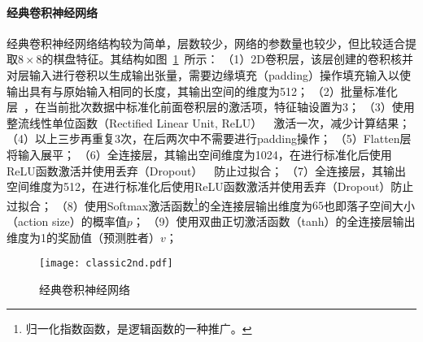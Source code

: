 \paragraph{经典卷积神经网络}
经典卷积神经网络结构较为简单，层数较少，网络的参数量也较少，但比较适合提取$8\times8$的棋盘特征。其结构如图~\ref{fig:cnn}~所示：
（1）2D卷积层，该层创建的卷积核并对层输入进行卷积以生成输出张量，需要边缘填充（padding）操作填充输入以使输出具有与原始输入相同的长度，其输出空间的维度为512；
（2）批量标准化层~\cite{batchnorm}，在当前批次数据中标准化前面卷积层的激活项，特征轴设置为3；
（3）使用整流线性单位函数（Rectified Linear Unit, ReLU）~\cite{xu2015empirical}~激活一次，减少计算结果；
（4）以上三步再重复3次，在后两次中不需要进行padding操作；
（5）Flatten层将输入展平；
（6）全连接层，其输出空间维度为1024，在进行标准化后使用ReLU函数激活并使用丢弃（Dropout）~\cite{srivastava2014dropout}~防止过拟合；
（7）全连接层，其输出空间维度为512，在进行标准化后使用ReLU函数激活并使用丢弃（Dropout）防止过拟合；
（8）使用Softmax激活函数\footnote{归一化指数函数，是逻辑函数的一种推广。}的全连接层输出维度为$65$也即落子空间大小（action size）的概率值$p$；
（9）使用双曲正切激活函数（tanh）的全连接层输出维度为1的奖励值（预测胜者）$v$；
\begin{figure}[!t]
    \centering
    \texttt{[image: classic2nd.pdf]}
    \caption[cnn]{%
    经典卷积神经网络%
      }
    \label{fig:cnn}
\end{figure}
